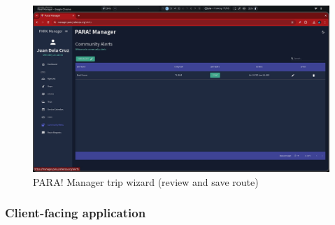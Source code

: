 \documentclass[journal]{./IEEE/IEEEtran}
\begin{document}
\begin{figure}[!h]
    \centering
        \includegraphics[scale=0.115]{./figures/manager/alerts.jpeg}
    \caption{PARA! Manager trip wizard (review and save route)}
\end{figure}

\subsubsection{\textbf{Client-facing application}}
\end{document}
